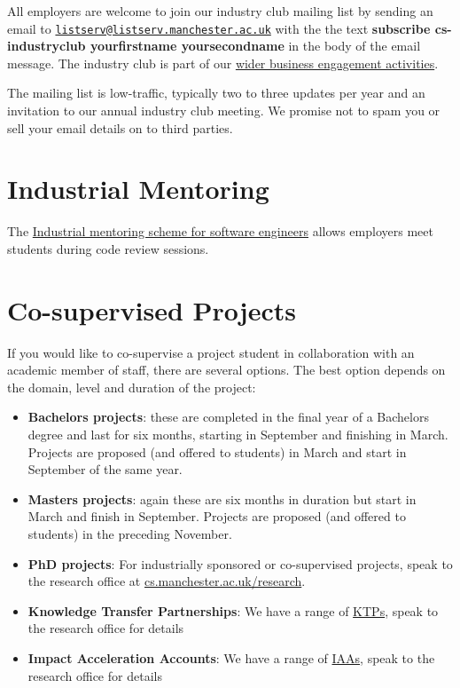 \documentclass[
  12pt,
]{book}
\providecommand{\tightlist}{%
  \setlength{\itemsep}{0pt}\setlength{\parskip}{0pt}}
\begin{document}
All employers are welcome to join our industry club mailing list by sending an email to \href{mailto:listserv@listserv.manchester.ac.uk}{\nolinkurl{listserv@listserv.manchester.ac.uk}} with the the text \textbf{subscribe cs-industryclub yourfirstname yoursecondname} in the body of the email message. The industry club is part of our \href{https://www.cs.manchester.ac.uk/connect/business-engagement/}{wider business engagement activities}.

The mailing list is low-traffic, typically two to three updates per year and an invitation to our annual industry club meeting. We promise not to spam you or sell your email details on to third parties.

\hypertarget{mentoring}{%
\section{Industrial Mentoring}\label{mentoring}}

The \href{https://www.cs.manchester.ac.uk/connect/business-engagement/industrial-mentoring/}{Industrial mentoring scheme for software engineers} allows employers meet students during code review sessions.

\hypertarget{cosupervise}{%
\section{Co-supervised Projects}\label{cosupervise}}

If you would like to co-supervise a project student in collaboration with an academic member of staff, there are several options. The best option depends on the domain, level and duration of the project:

\begin{itemize}
\tightlist
\item
  \textbf{Bachelors projects}: these are completed in the final year of a Bachelors degree and last for six months, starting in September and finishing in March. Projects are proposed (and offered to students) in March and start in September of the same year.
\item
  \textbf{Masters projects}: again these are six months in duration but start in March and finish in September. Projects are proposed (and offered to students) in the preceding November.
\item
  \textbf{PhD projects}: For industrially sponsored or co-supervised projects, speak to the research office at \href{https://www.cs.manchester.ac.uk/research/}{cs.manchester.ac.uk/research}.
\item
  \textbf{Knowledge Transfer Partnerships}: We have a range of \href{https://www.gov.uk/guidance/knowledge-transfer-partnerships-what-they-are-and-how-to-apply}{KTPs}, speak to the research office for details
\item
  \textbf{Impact Acceleration Accounts}: We have a range of \href{https://epsrc.ukri.org/innovation/fundingforimpact/impact-acceleration-accounts/}{IAAs}, speak to the research office for details
\end{itemize}
\end{document}
